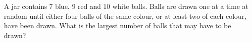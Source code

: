 A jar contains $7$ blue, $9$ red and $10$ white balls. Balls are drawn one at a time at random until either four balls of the same colour, or at least two of each colour, have been drawn. What is the largest number of balls that may have to be drawn?
